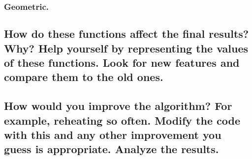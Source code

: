 \documentclass{article}
\begin{document}
            \subsubsection{Geometric.}
    
        \subsection{How do these functions affect the final results? Why? Help yourself by representing the values of these functions. Look for new features and compare them to the old ones.}
    
        \subsection{How would you improve the algorithm? For example, reheating so often. Modify
    the code with this and any other improvement you guess is appropriate. Analyze
    the results.}

 
\end{document}

